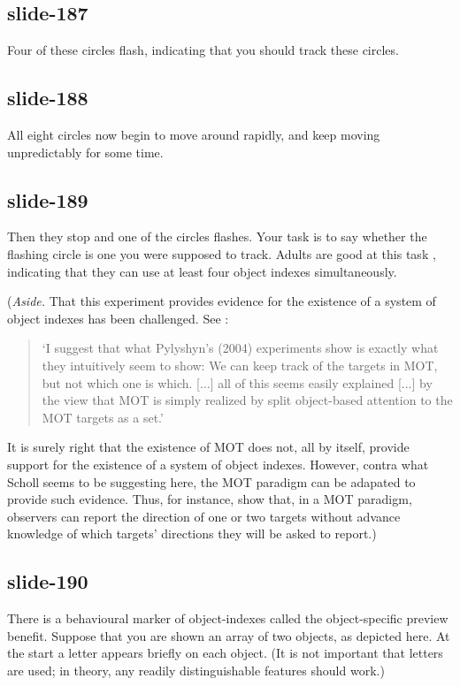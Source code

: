 \documentclass[12pt,\papersize]{extarticle}
\begin{document}
\subsection{slide-187}
Four of these circles flash, indicating that you should track these circles.

\subsection{slide-188}
All eight circles now begin to move around rapidly, and keep moving unpredictably for some time.

\subsection{slide-189}
Then they stop and one of the circles flashes.
Your task is to say whether the flashing circle is one you were supposed to track.
Adults are good at this task \citep{pylyshyn:1988_tracking}, indicating that they can use at least four object indexes simultaneously.

(\emph{Aside.} That this experiment provides evidence for the existence of
a system of object indexes has been challenged.
See \citet[p.\ 59]{scholl:2009_what}:
\begin{quote}
`I suggest that what Pylyshyn’s (2004) experiments show is exactly what they intuitively
seem to show: We can keep track of the targets in MOT, but not which one is which.
[...]
all of this seems easily explained [...] by the view
that MOT is simply realized by split object-based attention to the MOT targets as a set.'
\end{quote}
It is surely right that the existence of MOT does not, all by itself,
provide support for the existence of a system of object indexes.
However, contra what Scholl seems to be suggesting here, the MOT paradigm
can be adapated to provide such evidence.
Thus, for instance, \citet{horowitz:2010_direction} show that, in a MOT paradigm, observers
can report the direction of one or two targets without advance knowledge of which
targets' directions they will be asked to report.)

\subsection{slide-190}
There is a behavioural marker of object-indexes called the object-specific preview benefit.
Suppose that you are shown an array of two objects, as depicted here.
At the start a letter appears briefly on each object.
(It is not important that letters are used; in theory, any readily
distinguishable features should work.)
\end{document}
